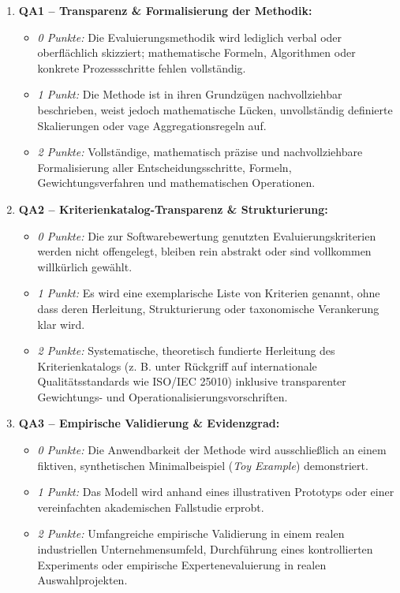 \begin{enumerate}
    \item \textbf{QA1 -- Transparenz \& Formalisierung der Methodik:} 
    \begin{itemize}
        \item \textit{0 Punkte:} Die Evaluierungsmethodik wird lediglich verbal oder oberflächlich skizziert; mathematische Formeln, Algorithmen oder konkrete Prozessschritte fehlen vollständig.
        \item \textit{1 Punkt:} Die Methode ist in ihren Grundzügen nachvollziehbar beschrieben, weist jedoch mathematische Lücken, unvollständig definierte Skalierungen oder vage Aggregationsregeln auf.
        \item \textit{2 Punkte:} Vollständige, mathematisch präzise und nachvollziehbare Formalisierung aller Entscheidungsschritte, Formeln, Gewichtungsverfahren und mathematischen Operationen.
    \end{itemize}
    \item \textbf{QA2 -- Kriterienkatalog-Transparenz \& Strukturierung:} 
    \begin{itemize}
        \item \textit{0 Punkte:} Die zur Softwarebewertung genutzten Evaluierungskriterien werden nicht offengelegt, bleiben rein abstrakt oder sind vollkommen willkürlich gewählt.
        \item \textit{1 Punkt:} Es wird eine exemplarische Liste von Kriterien genannt, ohne dass deren Herleitung, Strukturierung oder taxonomische Verankerung klar wird.
        \item \textit{2 Punkte:} Systematische, theoretisch fundierte Herleitung des Kriterienkatalogs (z. B. unter Rückgriff auf internationale Qualitätsstandards wie ISO/IEC 25010) inklusive transparenter Gewichtungs- und Operationalisierungsvorschriften.
    \end{itemize}
    \item \textbf{QA3 -- Empirische Validierung \& Evidenzgrad:} 
    \begin{itemize}
        \item \textit{0 Punkte:} Die Anwendbarkeit der Methode wird ausschließlich an einem fiktiven, synthetischen Minimalbeispiel (\textit{Toy Example}) demonstriert.
        \item \textit{1 Punkt:} Das Modell wird anhand eines illustrativen Prototyps oder einer vereinfachten akademischen Fallstudie erprobt.
        \item \textit{2 Punkte:} Umfangreiche empirische Validierung in einem realen industriellen Unternehmensumfeld, Durchführung eines kontrollierten Experiments oder empirische Expertenevaluierung in realen Auswahlprojekten.

\end{itemize}
\end{enumerate}
